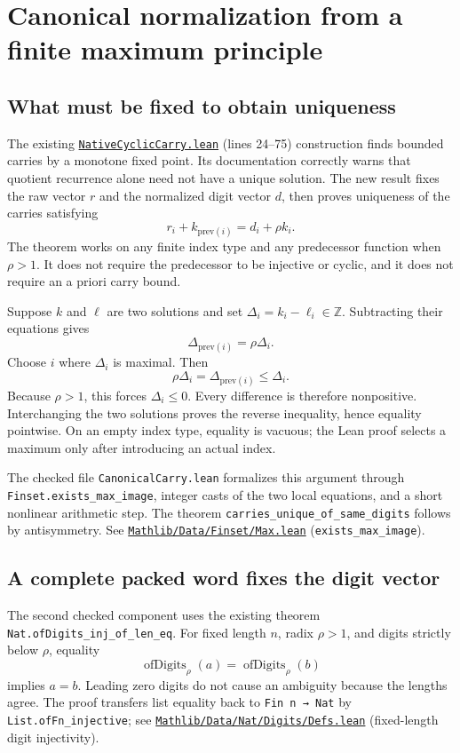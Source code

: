 \documentclass[11pt,letterpaper]{article}
\newcommand{\code}[1]{\nolinkurl{#1}}
\newcommand{\src}[2]{\href{https://github.com/VladimirReshetnikov/ProveIt/blob/e73fa2e916c9bb6f61c79e4fe2cd02b5f43e9d11/Computability/DiophantineConsistency/Lean/DiophantineConsistency/#1.lean}{\nolinkurl{#1.lean}} (lines #2)}
\newcommand{\mathsrc}[2]{\href{https://github.com/leanprover-community/mathlib4/blob/81a5d257c8e410db227a6665ed08f64fea08e997/Mathlib/#1.lean}{\nolinkurl{Mathlib/#1.lean}} (#2)}
\begin{document}
\section{Canonical normalization from a finite maximum principle}

\subsection{What must be fixed to obtain uniqueness}

The existing \src{NativeCyclicCarry}{24--75} construction finds bounded carries by a monotone fixed point. Its documentation correctly warns that quotient recurrence alone need not have a unique solution. The new result fixes the raw vector \(r\) and the normalized digit vector \(d\), then proves uniqueness of the carries satisfying
\[
 r_i+k_{\mathrm{prev}(i)}=d_i+\rho k_i.
\]
The theorem works on any finite index type and any predecessor function when \(\rho>1\). It does not require the predecessor to be injective or cyclic, and it does not require an a priori carry bound.

Suppose \(k\) and \(\ell\) are two solutions and set \(\Delta_i=k_i-\ell_i\in\mathbb Z\). Subtracting their equations gives
\[
 \Delta_{\mathrm{prev}(i)}=\rho\Delta_i.
\]
Choose \(i\) where \(\Delta_i\) is maximal. Then
\[
 \rho\Delta_i=\Delta_{\mathrm{prev}(i)}\le\Delta_i.
\]
Because \(\rho>1\), this forces \(\Delta_i\le0\). Every difference is therefore nonpositive. Interchanging the two solutions proves the reverse inequality, hence equality pointwise. On an empty index type, equality is vacuous; the Lean proof selects a maximum only after introducing an actual index.

The checked file \code{CanonicalCarry.lean} formalizes this argument through \code{Finset.exists_max_image}, integer casts of the two local equations, and a short nonlinear arithmetic step. The theorem \code{carries_unique_of_same_digits} follows by antisymmetry. See \mathsrc{Data/Finset/Max}{\code{exists_max_image}}.

\subsection{A complete packed word fixes the digit vector}

The second checked component uses the existing theorem \code{Nat.ofDigits_inj_of_len_eq}. For fixed length \(n\), radix \(\rho>1\), and digits strictly below \(\rho\), equality
\[
 \operatorname{ofDigits}_{\rho}(a)=\operatorname{ofDigits}_{\rho}(b)
\]
implies \(a=b\). Leading zero digits do not cause an ambiguity because the lengths agree. The proof transfers list equality back to \code{Fin n → Nat} by \code{List.ofFn_injective}; see \mathsrc{Data/Nat/Digits/Defs}{fixed-length digit injectivity}.
\end{document}
